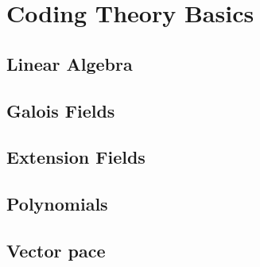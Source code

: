 \chapter{Coding Theory Basics}

\section{Linear Algebra}
\section{Galois Fields}
\section{Extension Fields}
\section{Polynomials}
\section{Vector pace}
